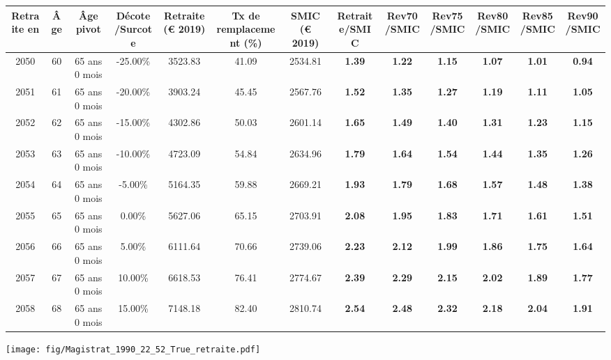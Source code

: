 { \scriptsize \begin{center} 
\begin{tabular}[htb]{|c|c||c|c||c|c||c||c|c|c|c|c|c|} 
\hline 
 Retraite en &  Âge &  Âge pivot &  Décote/Surcote &  Retraite (\euro{} 2019) &  Tx de remplacement (\%) &  SMIC (\euro{} 2019) &  Retraite/SMIC &  Rev70/SMIC &  Rev75/SMIC &  Rev80/SMIC &  Rev85/SMIC &  Rev90/SMIC \\ 
\hline \hline 
 2050 &  60 &  65 ans 0 mois &  -25.00\% &  3523.83 &  41.09 &  2534.81 &  {\bf 1.39} &  {\bf 1.22} &  {\bf 1.15} &  {\bf 1.07} &  {\bf 1.01} &  {\bf {\color{red} 0.94}} \\ 
\hline 
 2051 &  61 &  65 ans 0 mois &  -20.00\% &  3903.24 &  45.45 &  2567.76 &  {\bf 1.52} &  {\bf 1.35} &  {\bf 1.27} &  {\bf 1.19} &  {\bf 1.11} &  {\bf 1.05} \\ 
\hline 
 2052 &  62 &  65 ans 0 mois &  -15.00\% &  4302.86 &  50.03 &  2601.14 &  {\bf 1.65} &  {\bf 1.49} &  {\bf 1.40} &  {\bf 1.31} &  {\bf 1.23} &  {\bf 1.15} \\ 
\hline 
 2053 &  63 &  65 ans 0 mois &  -10.00\% &  4723.09 &  54.84 &  2634.96 &  {\bf 1.79} &  {\bf 1.64} &  {\bf 1.54} &  {\bf 1.44} &  {\bf 1.35} &  {\bf 1.26} \\ 
\hline 
 2054 &  64 &  65 ans 0 mois &  -5.00\% &  5164.35 &  59.88 &  2669.21 &  {\bf 1.93} &  {\bf 1.79} &  {\bf 1.68} &  {\bf 1.57} &  {\bf 1.48} &  {\bf 1.38} \\ 
\hline 
 2055 &  65 &  65 ans 0 mois &  0.00\% &  5627.06 &  65.15 &  2703.91 &  {\bf 2.08} &  {\bf 1.95} &  {\bf 1.83} &  {\bf 1.71} &  {\bf 1.61} &  {\bf 1.51} \\ 
\hline 
 2056 &  66 &  65 ans 0 mois &  5.00\% &  6111.64 &  70.66 &  2739.06 &  {\bf 2.23} &  {\bf 2.12} &  {\bf 1.99} &  {\bf 1.86} &  {\bf 1.75} &  {\bf 1.64} \\ 
\hline 
 2057 &  67 &  65 ans 0 mois &  10.00\% &  6618.53 &  76.41 &  2774.67 &  {\bf 2.39} &  {\bf 2.29} &  {\bf 2.15} &  {\bf 2.02} &  {\bf 1.89} &  {\bf 1.77} \\ 
\hline 
 2058 &  68 &  65 ans 0 mois &  15.00\% &  7148.18 &  82.40 &  2810.74 &  {\bf 2.54} &  {\bf 2.48} &  {\bf 2.32} &  {\bf 2.18} &  {\bf 2.04} &  {\bf 1.91} \\ 
\hline 
\hline 
\end{tabular} 
\end{center} } 

 \begin{center}\texttt{[image: fig/Magistrat\_1990\_22\_52\_True\_retraite.pdf]}\end{center} 

